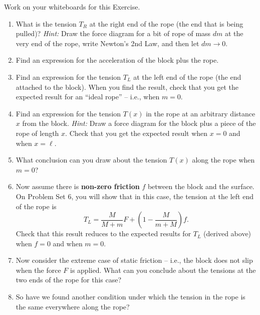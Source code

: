 \documentclass[11pt, letterpaper, openany]{book}
\newenvironment{exercise}[1][Exercise]{%
  \tcolorbox[blanker, breakable, left=1em,
    before skip=1em, after skip=1em,
    borderline west={3pt}{0pt}{PhysNavy},
    colback=PhysCream,
    before upper={\textcolor{PhysNavy}{\sffamily\bfseries #1:}\space}
  ]%
}{%
  \endtcolorbox%
}
\begin{document}
\begin{exercise}[Exercise 1]
Work on your whiteboards for this Exercise.
\begin{enumerate}[label=(\alph*)]
    \item What is the tension $T_R$ at the right end of the rope (the end that is being pulled)? \textit{Hint:} Draw the force diagram for a bit of rope of mass $dm$ at the very end of the rope, write Newton's 2nd Law, and then let $dm \to 0$.
    \item Find an expression for the acceleration of the block plus the rope.
    \item Find an expression for the tension $T_L$ at the left end of the rope (the end attached to the block). When you find the result, check that you get the expected result for an ``ideal rope'' -- i.e., when $m = 0$.
    \item Find an expression for the tension $T(x)$ in the rope at an arbitrary distance $x$ from the block.
    \textit{Hint:} Draw a force diagram for the block plus a piece of the rope of length $x$.
    Check that you get the expected result when $x = 0$ and when $x = \ell$.
    \item What conclusion can you draw about the tension $T(x)$ along the rope when $m = 0$?
    \item Now assume there is \textbf{non-zero friction} $f$ between the block and the surface. On Problem Set 6, you will show that in this case, the tension at the left end of the rope is
    \[ T_L = \frac{M}{M+m} F + \left(1 - \frac{M}{m+M}\right) f. \]
    Check that this result reduces to the expected results for $T_L$ (derived above) when $f = 0$ and when $m = 0$.
    \item Now consider the extreme case of static friction -- i.e., the block does not slip when the force $F$ is applied. What can you conclude about the tensions at the two ends of the rope for this case?
    \item So have we found another condition under which the tension in the rope is the same everywhere along the rope?
\end{enumerate}
\end{exercise}
\end{document}
